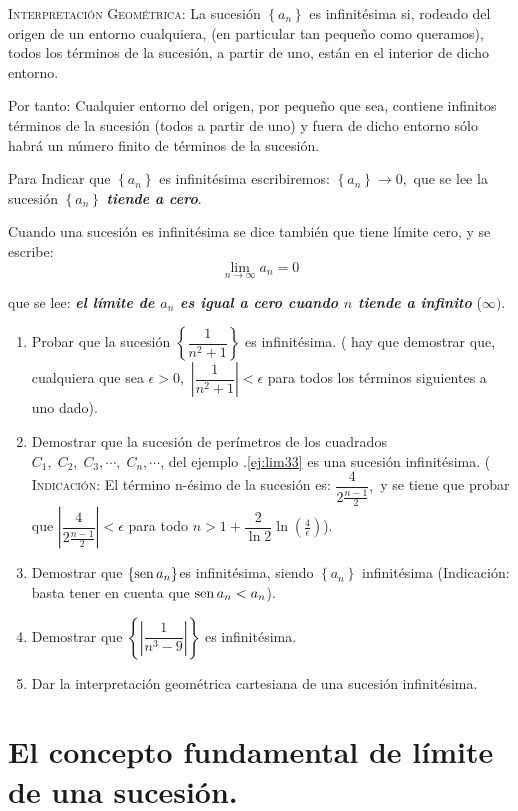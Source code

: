 \documentclass[oneside,english,spanish,2m,twoside,svgnames,x11names,HTML,twoside,12pt]{libro-matua}\usepackage[]{graphicx}\usepackage[]{color}
\newcommand{\noun}[1]{\textsc{#1}}
\def\myref#1{\textcolor{ptctitle}{\thesection .\ref{#1}}}
\newcommand{\val}[1]{\left|#1\right|}
\begin{document}
\noun{Interpretación Geométrica}: La sucesión $\left\{ a_{n}\right\} $
es infinitésima si, rodeado del origen de un entorno cualquiera, (en
particular tan pequeño como queramos), todos los términos de la sucesión,
a partir de uno, están en el interior de dicho entorno.

Por tanto: Cualquier entorno del origen, por pequeño que sea, contiene
infinitos términos de la sucesión (todos a partir de uno) y fuera
de dicho entorno sólo habrá un número finito de términos de la sucesión. 

\notacion Para Indicar que $\left\{ a_{n}\right\} $ es infinitésima
escribiremos: $\left\{ a_{n}\right\} \rightarrow0,$ que se lee la
sucesión $\left\{ a_{n}\right\} $ \textbf{\textsl{tiende a cero}}.

Cuando una sucesión es infinitésima se dice también que tiene límite
cero, y se escribe:
\[
\lim_{n\rightarrow\infty}a_{n}=0
\]

que se lee: \textbf{\textsl{el límite de $a_{n}$ es igual a cero
cuando $n$ tiende a infinito}} ($\infty).$

\begin{ejercicios}[]
\begin{enumerate}
\item Probar que la sucesión $\left\{ \dfrac{1}{n^{2}+1}\right\} $ es infinitésima.
( hay que demostrar que, cualquiera que sea $\epsilon>0,$ $\val{\dfrac{1}{n^{2}+1}}<\epsilon$
para todos los términos siguientes a uno dado).
\item Demostrar que la sucesión de perímetros de los cuadrados $C_{1},\;C_{2},\;C_{3},\cdots,\;C_{n},\cdots$,
del ejemplo \myref{ej:lim33} es una sucesión infinitésima. ( \noun{Indicación}:
El término n-ésimo de la sucesión es: $\dfrac{4}{2\frac{n-1}{2}},$
y se tiene que probar que $\val{\dfrac{4}{2\frac{n-1}{2}}}<\epsilon$
para todo $n>1+\dfrac{2}{\ln2}\ln\left(\frac{4}{\epsilon}\right)$).
\item Demostrar que $\left\{ \operatorname{sen} a_{n}\right\} $es infinitésima, siendo
$\left\{ a_{n}\right\} $ infinitésima (Indicación: basta tener en
cuenta que $\operatorname{sen} a_{n}<a_{n}$).
\item Demostrar que $\left\{ \val{\dfrac{1}{n^{3}-9}}\right\} $ es infinitésima.
\item Dar la interpretación geométrica cartesiana de una sucesión infinitésima.
\end{enumerate}
\end{ejercicios}

\section{El concepto fundamental de límite de una sucesión.}
\end{document}

